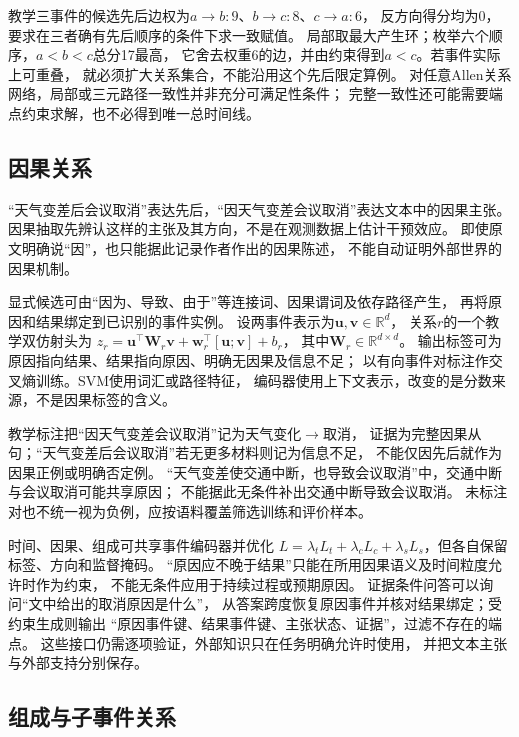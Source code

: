 教学三事件的候选先后边权为$a\to b:9$、$b\to c:8$、$c\to a:6$，
反方向得分均为0，要求在三者确有先后顺序的条件下求一致赋值。
局部取最大产生环；枚举六个顺序，$a<b<c$总分17最高，
它舍去权重6的边，并由约束得到$a<c$。若事件实际上可重叠，
就必须扩大关系集合，不能沿用这个先后限定算例。
对任意Allen关系网络，局部或三元路径一致性并非充分可满足性条件；
完整一致性还可能需要端点约束求解，也不必得到唯一总时间线。

\subsection{因果关系}
\label{sec:nlp-extraction-causal}

“天气变差后会议取消”表达先后，“因天气变差会议取消”表达文本中的因果主张。
因果抽取先辨认这样的主张及其方向，不是在观测数据上估计干预效应。
即使原文明确说“因”，也只能据此记录作者作出的因果陈述，
不能自动证明外部世界的因果机制。

显式候选可由“因为、导致、由于”等连接词、因果谓词及依存路径产生，
再将原因和结果绑定到已识别的事件实例。
设两事件表示为$\bm{u},\bm{v}\in\mathbb{R}^{d}$，
关系$r$的一个教学双仿射头为
$z_r=\bm{u}^{\top}\bm{W}_r\bm{v}
+\bm{w}_r^{\top}[\bm{u};\bm{v}]+b_r$，
其中$\bm{W}_r\in\mathbb{R}^{d\times d}$。
输出标签可为原因指向结果、结果指向原因、明确无因果及信息不足；
以有向事件对标注作交叉熵训练。SVM使用词汇或路径特征，
编码器使用上下文表示，改变的是分数来源，不是因果标签的含义。

教学标注把“因天气变差会议取消”记为天气变化$\to$取消，
证据为完整因果从句；“天气变差后会议取消”若无更多材料则记为信息不足，
不能仅因先后就作为因果正例或明确否定例。
“天气变差使交通中断，也导致会议取消”中，交通中断与会议取消可能共享原因；
不能据此无条件补出交通中断导致会议取消。
未标注对也不统一视为负例，应按语料覆盖筛选训练和评价样本。

时间、因果、组成可共享事件编码器并优化
$L=\lambda_tL_t+\lambda_cL_c+\lambda_sL_s$，但各自保留标签、方向和监督掩码。
“原因应不晚于结果”只能在所用因果语义及时间粒度允许时作为约束，
不能无条件应用于持续过程或预期原因。
证据条件问答可以询问“文中给出的取消原因是什么”，
从答案跨度恢复原因事件并核对结果绑定；受约束生成则输出
“原因事件键、结果事件键、主张状态、证据”，过滤不存在的端点。
这些接口仍需逐项验证，外部知识只在任务明确允许时使用，
并把文本主张与外部支持分别保存。

\subsection{组成与子事件关系}
\label{sec:nlp-extraction-subevents}

